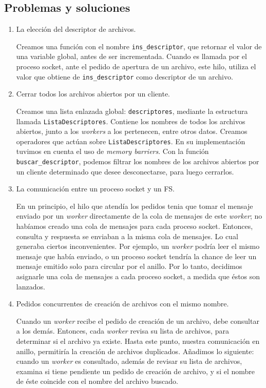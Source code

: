 \documentclass[a4paper, 8pt]{article}
\begin{document}
\subsection{Problemas y soluciones}
  \begin{enumerate}
    \item La elección del descriptor de archivos.
    
    Creamos una función con el nombre \texttt{ins\_descriptor}, que retornar el valor de una variable global, antes de ser incrementada.
    Cuando es llamada por el proceso socket, ante el pedido de apertura de un archivo, este hilo, utiliza el valor que obtiene de \texttt{ins\_descriptor} como descriptor de un archivo.
    
    \item Cerrar todos los archivos abiertos por un cliente.
    
    Creamos una lista enlazada global: \texttt{descriptores}, mediante la estructura llamada \texttt{ListaDescriptores}. Contiene los nombres de todos los archivos abiertos, junto a los \textit{workers} a los pertenecen, entre otros datos.
    Creamos operadores que actúan sobre \texttt{ListaDescriptores}.
    En su implementación tuvimos en cuenta el uso de \textit{memory barriers}.
    Con la función \texttt{buscar\_descriptor}, podemos filtrar los nombres de los archivos abiertos por un cliente determinado que desee desconectarse, para luego cerrarlos.
    
    \item La comunicación entre un proceso socket y un FS.
    
    En un principio, el hilo que atendía los pedidos tenia que tomar el mensaje enviado por un \textit{worker} directamente de la cola de mensajes de este \textit{worker};
    no habíamos creado una cola de mensajes para cada proceso socket. 
    Entonces, consulta y respuesta se enviaban a la misma cola de mensajes. Lo cual generaba ciertos inconvenientes. Por ejemplo,
    un \textit{worker} podría leer el mismo mensaje que había enviado, o un proceso socket tendría la chance de
    leer un mensaje emitido solo para circular por el anillo.
    Por lo tanto, decidimos asignarle una cola de mensajes a cada proceso socket, a medida que éstos son lanzados.
    
    \item Pedidos concurrentes de creación de archivos con el mismo nombre.
    
    Cuando un \textit{worker} recibe el pedido de creación de un archivo, debe consultar a los demás. Entonces, cada \textit{worker} revisa su lista de archivos, para
    determinar si el archivo ya existe. Hasta este punto, nuestra comunicación en anillo, permitiría la creación de archivos duplicados.
    Añadimos lo siguiente:
    cuando un \textit{worker} es consultado, además de revisar su lista de archivos, examina si tiene pendiente un pedido de creación de archivo,
    y si el nombre de éste coincide con el nombre del archivo buscado.
    

\end{enumerate}
\end{document}
